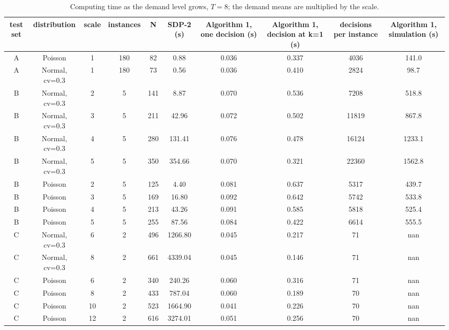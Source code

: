 \begin{table}[H]
\centering
\caption{Computing time as the demand level grows, $T=8$; the demand means are multiplied by the scale.}
\label{tab:test2_Q3_scale}
\begin{tabular}{cccccccccc}
\toprule
test set & distribution & scale & instances & N & SDP-2 (s) & Algorithm 1, one decision (s) & Algorithm 1, decision at k=1 (s) & decisions per instance & Algorithm 1, simulation (s) \\
\midrule
A & Poisson & 1 & 180 & 82 & 0.88 & 0.036 & 0.337 & 4036 & 141.0 \\
A & Normal, cv=0.3 & 1 & 180 & 73 & 0.56 & 0.036 & 0.410 & 2824 & 98.7 \\
B & Normal, cv=0.3 & 2 & 5 & 141 & 8.87 & 0.070 & 0.536 & 7208 & 518.8 \\
B & Normal, cv=0.3 & 3 & 5 & 211 & 42.96 & 0.072 & 0.502 & 11819 & 867.8 \\
B & Normal, cv=0.3 & 4 & 5 & 280 & 131.41 & 0.076 & 0.478 & 16124 & 1233.1 \\
B & Normal, cv=0.3 & 5 & 5 & 350 & 354.66 & 0.070 & 0.321 & 22360 & 1562.8 \\
B & Poisson & 2 & 5 & 125 & 4.40 & 0.081 & 0.637 & 5317 & 439.7 \\
B & Poisson & 3 & 5 & 169 & 16.80 & 0.092 & 0.642 & 5742 & 533.8 \\
B & Poisson & 4 & 5 & 213 & 43.26 & 0.091 & 0.585 & 5818 & 525.4 \\
B & Poisson & 5 & 5 & 255 & 87.56 & 0.084 & 0.422 & 6614 & 555.5 \\
C & Normal, cv=0.3 & 6 & 2 & 496 & 1266.80 & 0.045 & 0.217 & 71 & nan \\
C & Normal, cv=0.3 & 8 & 2 & 661 & 4339.04 & 0.045 & 0.146 & 71 & nan \\
C & Poisson & 6 & 2 & 340 & 240.26 & 0.060 & 0.316 & 71 & nan \\
C & Poisson & 8 & 2 & 433 & 787.04 & 0.060 & 0.189 & 70 & nan \\
C & Poisson & 10 & 2 & 523 & 1664.90 & 0.041 & 0.226 & 70 & nan \\
C & Poisson & 12 & 2 & 616 & 3274.01 & 0.051 & 0.256 & 70 & nan \\
\bottomrule
\end{tabular}
\end{table}